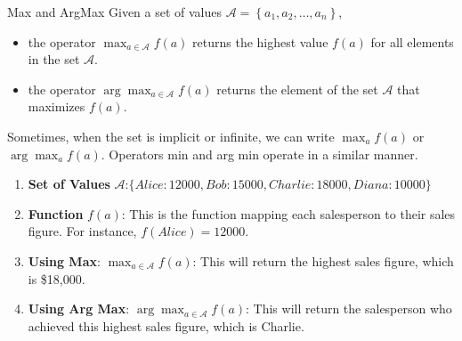\documentclass[9pt,dvipsnames]{beamer}
\begin{document}
\begin{frame}{Max and ArgMax}
	Given a set of values $\mathcal{A}=\left\{a_{1}, a_{2}, \ldots, a_{n}\right\}$, 
	
	\begin{itemize}
		\item the operator $\max _{a \in \mathcal{A}} f(a)$ returns the highest value $f(a)$ for all elements in the set $\mathcal{A}$.
		\item the operator $\arg \max _{a \in \mathcal{A}} f(a)$ returns the element of the set $\mathcal{A}$ that maximizes $f(a)$.
	\end{itemize}
	Sometimes, when the set is implicit or infinite, we can write $\max _{a} f(a)$ or $\arg \max _{a} f(a)$. Operators min and arg min operate in a similar manner.
	
	\begin{tcolorbox}[enhanced jigsaw, breakable, pad at break*=1mm, colback=gray!20!white, colframe=black!85!black, title=\textbf{Example}]
		\begin{enumerate}
			\item \textbf{Set of Values} $\mathcal{A}$:$ \{ Alice: 12000, Bob: 15000, Charlie: 18000, Diana: 10000 \}$
			\item \textbf{Function} $f(a)$: This is the function mapping each salesperson to their sales figure. For instance, $f(Alice) = 12000$.
			\item \textbf{Using Max}: $\max_{a \in \mathcal{A}} f(a)$: This will return the highest sales figure, which is \$18,000.
			\item \textbf{Using Arg Max}: $\arg \max_{a \in \mathcal{A}} f(a)$: This will return the salesperson who achieved this highest sales figure, which is Charlie.
		\end{enumerate}
	\end{tcolorbox}
\end{frame}
\end{document}
